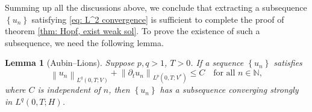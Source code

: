 \documentclass[a4paper, 12pt, oneside]{amsart}
\newtheorem{lemma}[theorem]{Lemma}
\theoremstyle{definition}
\theoremstyle{remark}
\newcommand{\norm}[1]{\left\lVert #1 \right\rVert}
\newcommand{\set}[1]{\left\{ #1 \right\}}
\renewcommand{\leq}{\leqslant}
\newcommand{\p}{\partial}
\newcommand{\N}{\mathbb{N}}
\begin{document}
Summing up all the discussions above, we conclude that extracting a subsequence $\set{u_n}$ satisfying \eqref{eq: L^2 convergence} is sufficient to complete the proof of theorem \ref{thm: Hopf, exist weak sol}. To prove the existence of such a subsequence, we need the following lemma.

\begin{lemma}[Aubin--Lions]
    \label{lemma: Aubin--Lions}
    Suppose $p, q>1$, $T>0$. If a sequence $\set{u_n}$ satisfies
    \begin{equation}
        \label{eq: Aubin--Lions condition}
        \norm{u_n}_{L^q(0, T; V)} + \norm{\p_tu_n}_{L^p(0, T; V^*)}\leq C\quad\text{for all $n\in\N$},
    \end{equation}
    where $C$ is independent of $n$, then $\set{u_n}$ has a subsequence converging strongly in $L^q(0, T; H)$.
\end{lemma}
\end{document}
